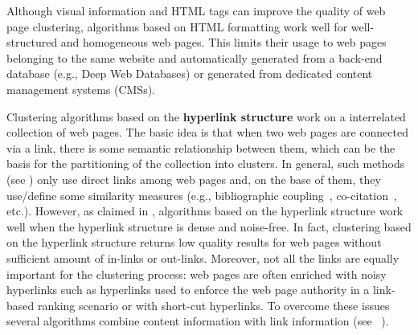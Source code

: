 Although visual information and HTML tags can improve the quality of web page clustering, algorithms based on HTML formatting  work well for well-structured and homogeneous web pages. This limits their usage to web pages  belonging to the same website and automatically generated from a back-end database (e.g., Deep Web Databases) or generated from dedicated content management systems (CMSs).



Clustering algorithms based on the \textbf{hyperlink structure} work on a interrelated collection of web pages. The basic idea is that when two web pages are connected via a link, there is some semantic relationship between them, which can be the basis for the partitioning of the collection into clusters. %
In general, such methods (see \cite{Cristo:2003}) only use direct links among web pages and, on the base of them, they use/define some similarity measures (e.g., bibliographic coupling~\cite{Kessler:1963}, co-citation~\cite{Small:1973}, etc.). 
However, as claimed in \cite{Fisher:2003}, algorithms based on the hyperlink structure work well when the hyperlink structure is dense and noise-free.
In fact, clustering based on the hyperlink structure returns low quality results for web pages without sufficient amount of in-links or out-links. Moreover, not all the links are equally important for the clustering process: web pages are often enriched with noisy hyperlinks such as hyperlinks used to enforce the web page authority in a link-based ranking scenario or with short-cut hyperlinks. To overcome these issues several algorithms combine content information with link information (see  ~\cite{He:2002, Modha:2000, Wang:2002, Drost:2005, Angelova:2006, Lin:2010}). %
